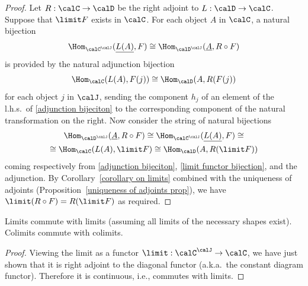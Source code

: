 \begin{proof}
    Let $R:\calC \to \calD $ be the right adjoint to $L:\calD \to\calC $. Suppose that $\limit F$ exists in $\calC $. For each object $A$ in $\calC $, a natural bijection
    \[\Hom_{\calC ^\calJ }(\underline{L(A)},F)\cong \Hom_{\calD ^\calJ }(\underline{A},R\circ F) \label{adjunction bijeciton}\]
    is provided by the natural adjunction bijection
    \[\Hom_{\calC }(L(A),F(j))\cong \Hom_{\calD }(A,R(F(j))\]
    for each object $j$ in $\calJ $, sending the component $h_j$ of an element of the l.h.s.~of \eqref{adjunction bijeciton} to the corresponding component of the natural transformation on the right. Now consider the string of natural bijections
    \begin{multline}
        \Hom_{\calD ^\calJ }(\underline{A},R\circ F)\cong \Hom_{\calC ^\calJ }(\underline{L(A)},F)\cong \\ 
        \cong \Hom_{\calC }(L(A),\limit F)\cong \Hom_{\calD }(A,R(\limit F))
    \end{multline}
    coming respectively from \eqref{adjunction bijeciton}, \eqref{limit functor bijection}, and the adjunction. By Corollary~\ref{corollary on limits} combined with the uniqueness of adjoints (Proposition~\ref{uniqueness of adjoints prop}), we have $\limit(R\circ F)= R(\limit F)$ as required.
\end{proof}
\begin{cor}
    Limits commute with limits (assuming all limits of the necessary shapes exist). Colimits commute with colimits.
\end{cor}
\begin{proof}
    Viewing the limit as a functor  $\limit:\calC^\calJ\to \calC$, we have just shown that it is right adjoint to the diagonal functor (a.k.a.~the constant diagram functor). Therefore it is continuous, i.e., commutes with limits. 
\end{proof}

